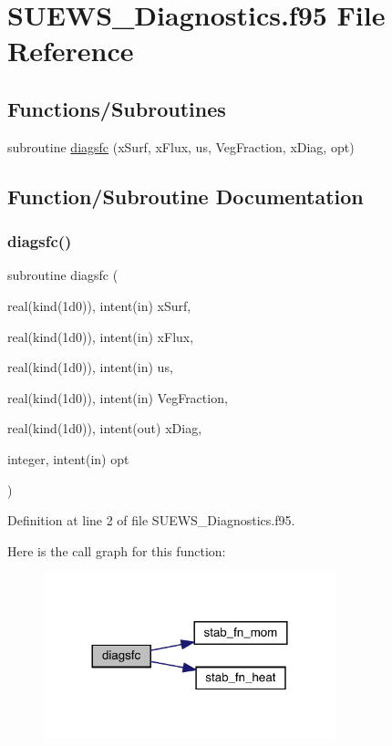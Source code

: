 \hypertarget{_s_u_e_w_s___diagnostics_8f95}{}\section{S\+U\+E\+W\+S\+\_\+\+Diagnostics.\+f95 File Reference}
\label{_s_u_e_w_s___diagnostics_8f95}
\subsection*{Functions/\+Subroutines}
\begin{DoxyCompactItemize}
\item 
subroutine \hyperlink{_s_u_e_w_s___diagnostics_8f95_aebc4694f2c98d834f1b236f7b49cb4b7}{diagsfc} (x\+Surf, x\+Flux, us, Veg\+Fraction, x\+Diag, opt)
\end{DoxyCompactItemize}


\subsection{Function/\+Subroutine Documentation}
\mbox{\label{_s_u_e_w_s___diagnostics_8f95_aebc4694f2c98d834f1b236f7b49cb4b7}} 
\subsubsection{\texorpdfstring{diagsfc()}{diagsfc()}}
{\footnotesize\ttfamily subroutine diagsfc (\begin{DoxyParamCaption}\item[{real(kind(1d0)), intent(in)}]{x\+Surf,  }\item[{real(kind(1d0)), intent(in)}]{x\+Flux,  }\item[{real(kind(1d0)), intent(in)}]{us,  }\item[{real(kind(1d0)), intent(in)}]{Veg\+Fraction,  }\item[{real(kind(1d0)), intent(out)}]{x\+Diag,  }\item[{integer, intent(in)}]{opt }\end{DoxyParamCaption})}



Definition at line 2 of file S\+U\+E\+W\+S\+\_\+\+Diagnostics.\+f95.

Here is the call graph for this function\+:\nopagebreak
\begin{figure}[H]
\begin{center}
\leavevmode
\includegraphics[width=240pt]{_s_u_e_w_s___diagnostics_8f95_aebc4694f2c98d834f1b236f7b49cb4b7_cgraph}
\end{center}
\end{figure}
